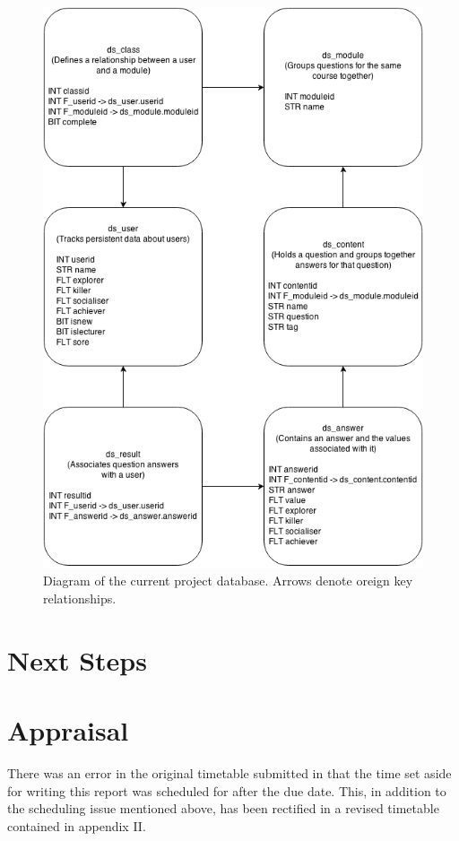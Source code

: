 \documentclass[10pt,a4paper]{report}
\begin{document}
\begin{figure}
	\includegraphics[width=\textwidth]{../img/database.png}
	\caption{Diagram of the current project database. Arrows denote oreign key relationships.}
	\label{db}
\end{figure}
\section*{Next Steps}
\section*{Appraisal}
There was an error in the original timetable submitted in that the time set aside for writing this report was scheduled for after the due date. This, in addition to the scheduling issue mentioned above, has been rectified in a revised timetable contained in appendix II.
\end{document}
